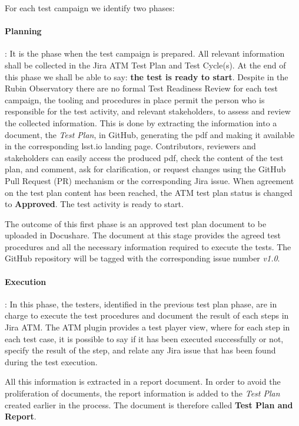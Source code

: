 For each test campaign we identify two phases:

\paragraph{Planning}:
It is the phase when the test campaign is prepared. All relevant information shall be collected in the Jira ATM Test Plan and 
Test Cycle(s). 
At the end of this phase we shall be able to say: \textbf{the test is ready to start}.
Despite in the Rubin Observatory there are no formal Test Readiness Review for each test campaign, 
the tooling and procedures in place permit the person who is responsible for the test activity, and relevant stakeholders, to assess and review the collected information. 
This is done by extracting the information into a document, the \textit{Test Plan}, in GitHub, generating the pdf and making it available
in the corresponding lsst.io landing page. Contributors, reviewers and stakeholders can easily access the produced pdf,
check the content of the test plan, and comment, ask for clarification, or request changes using the GitHub
Pull Request (PR) mechanism or the corresponding Jira issue.
When agreement on the test plan content has been reached, the ATM test plan status is changed to \textbf{Approved}. The test activity is ready to start.

The outcome of this first phase is an approved test plan document to be uploaded in Docushare. 
The document at this stage provides the agreed test procedures and all the necessary information required to execute the tests.
The GitHub repository will be tagged with the corresponding issue number \textit{v1.0}.

\paragraph{Execution}:
In this phase, the testers, identified in the previous test plan phase, are in charge to execute the test procedures and 
document the result of each steps in Jira ATM.
The ATM plugin provides a test player view, where for each step in each test case, it is possible to say if it has been executed successfully or not,
specify the result of the step, and relate any Jira issue that has been found during the test execution.

All this information is extracted in a report document.
In order to avoid the proliferation of documents, the  report information is added to the \textit{Test Plan} created earlier in the process.
The document is therefore called \textbf{Test Plan and Report}.


